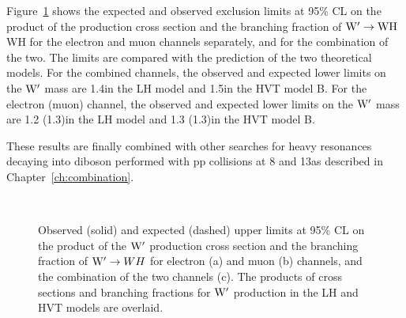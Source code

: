 Figure~\ref{fig:limitsFullCLS-WH} shows the expected and observed exclusion limits at 95\% CL on the product of the \Wpr production cross section and the branching fraction of $\mathrm{W}^\prime\to\mathrm{W}\mathrm{H}$WH for the
electron and muon channels separately, and for the combination of the two. The limits are compared with the prediction of the two theoretical models.
For the combined channels, the observed and expected lower limits on the $\mathrm{W}^\prime$ mass are 1.4\TeV in the LH model and 1.5\TeV in the HVT model B.
For the electron (muon) channel, the observed and expected lower limits on the $\mathrm{W}^\prime$ mass are 1.2 (1.3)\TeV in the LH model and 1.3 (1.3)\TeV in the HVT model B.

These results are finally combined with other searches for heavy resonances decaying into diboson performed with pp collisions at 8 and 13\TeV as described in Chapter~\ref{ch:combination}.

 \begin{figure}[!htb]
\centering
{}
\\
\caption{
  Observed (solid) and expected (dashed) upper limits at 95\% CL on the
  product of the $\mathrm{W}^\prime$ production cross section and the branching
  fraction of $\mathrm{W}^\prime\to WH$ for electron (a) and muon (b) channels,
  and the combination of the two channels (c). The products of cross sections and branching fractions for $\mathrm{W}^\prime$ production in the LH and HVT models are overlaid.
}
\label{fig:limitsFullCLS-WH}
\end{figure}